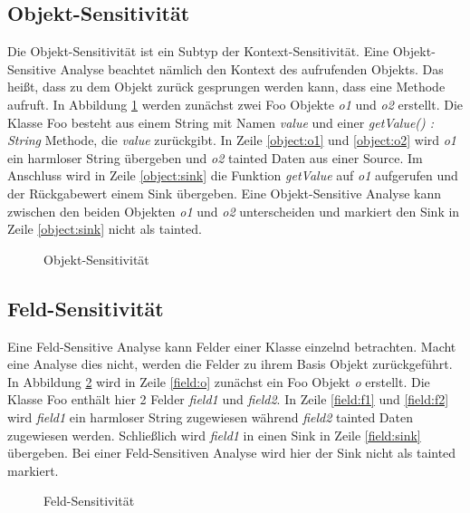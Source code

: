 \documentclass[runningheads]{llncs}
\begin{document}
\subsection{Objekt-Sensitivität}
Die Objekt-Sensitivität ist ein Subtyp der Kontext-Sensitivität. Eine Objekt-Sensitive Analyse beachtet nämlich den Kontext des aufrufenden Objekts. Das heißt, dass zu dem Objekt zurück gesprungen werden kann, dass eine Methode aufruft.
In Abbildung \ref{fig:object_code} werden zunächst zwei Foo Objekte \emph{o1} und \emph{o2} erstellt. Die Klasse Foo  besteht aus einem String mit Namen \emph{value} und einer \emph{getValue() : String} Methode, die \emph{value} zurückgibt. In Zeile \ref{object:o1} und \ref{object:o2} wird \emph{o1} ein harmloser String übergeben und \emph{o2} tainted Daten aus einer Source. Im Anschluss wird in Zeile \ref{object:sink} die Funktion \emph{getValue} auf \emph{o1} aufgerufen und der Rückgabewert einem Sink übergeben. Eine Objekt-Sensitive Analyse kann zwischen den beiden Objekten \emph{o1} und \emph{o2} unterscheiden und markiert den Sink in Zeile \ref{object:sink} nicht als tainted. 

\begin{figure}

\caption{Objekt-Sensitivität}
\label{fig:object_code} 
\end{figure}

\subsection{Feld-Sensitivität}
Eine Feld-Sensitive Analyse kann Felder einer Klasse einzelnd betrachten. Macht eine Analyse dies nicht, werden die Felder zu ihrem Basis Objekt zurückgeführt.
In Abbildung \ref{fig:field_code} wird in Zeile \ref{field:o} zunächst ein Foo Objekt \emph{o} erstellt. Die Klasse Foo enthält hier 2 Felder \emph{field1} und \emph{field2}. In Zeile \ref{field:f1} und \ref{field:f2} wird \emph{field1} ein harmloser String zugewiesen während \emph{field2} tainted Daten zugewiesen werden. Schließlich wird \emph{field1} in einen Sink in Zeile \ref{field:sink} übergeben. Bei einer Feld-Sensitiven Analyse wird hier der Sink nicht als tainted markiert.

\begin{figure}

\caption{Feld-Sensitivität}
\label{fig:field_code}
\end{figure}
\end{document}

